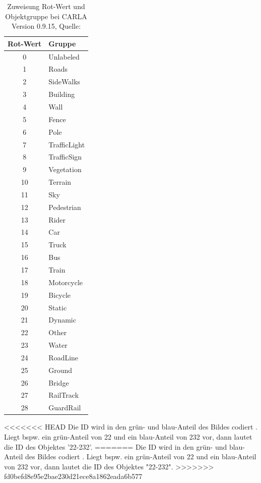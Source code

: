 \begin{table}
	\begin{center}
		{\small %
			\begin{tabular}{c l}
				\toprule
				\textbf{Rot-Wert} & \textbf{Gruppe} \\
				\midrule
				0  & Unlabeled \\
				1  & Roads \\
				2  & SideWalks \\
				3  & Building \\
				4  & Wall \\
				5  & Fence \\
				6  & Pole \\
				7  & TrafficLight \\
				8  & TrafficSign \\
				9  & Vegetation \\
				10 & Terrain \\
				11 & Sky \\
				12 & Pedestrian \\
				13 & Rider \\
				14 & Car \\
				15 & Truck \\
				16 & Bus \\
				17 & Train \\
				18 & Motorcycle \\
				19 & Bicycle \\
				20 & Static \\
				21 & Dynamic \\
				22 & Other \\
				23 & Water \\
				24 & RoadLine \\
				25 & Ground \\
				26 & Bridge \\
				27 & RailTrack \\
				28 & GuardRail \\
				\bottomrule
			\end{tabular}
		}%
	\end{center}
	\caption{Zuweisung Rot-Wert und Objektgruppe bei CARLA Version 0.9.15, Quelle: \cite{lit_website_carla_documentation}}\label{tab:rot_tag}
	
\end{table}



<<<<<<< HEAD
Die {\ac{ID}} wird in den grün- und blau-Anteil des Bildes codiert \cite{lit_website_carla_documentation}. Liegt bspw. ein grün-Anteil von 22 und ein blau-Anteil von 232 vor, dann lautet die {\ac{ID}} des Objektes '22-232'.
=======
Die {\ac{ID}} wird in den grün- und blau-Anteil des Bildes codiert \cite{lit_website_carla_documentation}. Liegt bspw. ein grün-Anteil von 22 und ein blau-Anteil von 232 vor, dann lautet die {\ac{ID}} des Objektes "22-232".
>>>>>>> fd0befd8e95e2bae230d21ece8a1862eada6b577

